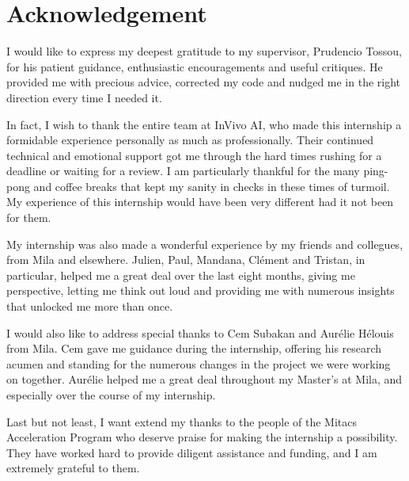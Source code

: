 \documentclass[11pt]{article}
\numberwithin{equation}{subsection}
\begin{document}
%
%
%
%
%
%
%



\clearpage
\section*{Acknowledgement}

I would like to express my deepest gratitude to my supervisor, Prudencio Tossou, for his patient guidance, enthusiastic encouragements and useful critiques. He provided me with precious advice, corrected my code and nudged me in the right direction every time I needed it.

In fact, I wish to thank the entire team at InVivo AI, who made this internship a formidable experience personally as much as professionally. Their continued technical and emotional support got me through the hard times rushing for a deadline or waiting for a review. I am particularly thankful for the many ping-pong and coffee breaks that kept my sanity in checks in these times of turmoil.
My experience of this internship would have been very different had it not been for them.

My internship was also made a wonderful experience by my friends and collegues, from Mila and elsewhere. Julien, Paul, Mandana, Clément and Tristan, in particular, helped me a great deal over the last eight months, giving me perspective, letting me think out loud and providing me with numerous insights that unlocked me more than once.

I would also like to address special thanks to Cem Subakan and Aurélie Hélouis from Mila. Cem gave me guidance during the internship, offering his research acumen and standing for the numerous changes in the project we were working on together. Aurélie helped me a great deal throughout my Master's at Mila, and especially over the course of my internship.

Last but not least, I want extend my thanks to the people of the Mitacs Acceleration Program who deserve praise for making the internship a possibility. They have worked hard to provide diligent assistance and funding, and I am extremely grateful to them.





\end{document}
